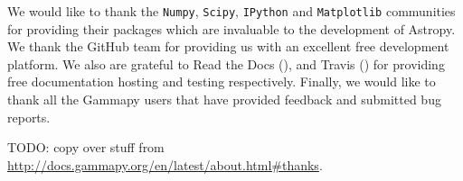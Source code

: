 \begin{acknowledgements}

We would like to thank the \texttt{Numpy}, \texttt{Scipy}, \texttt{IPython} and
\texttt{Matplotlib} communities for providing their packages which are invaluable
to the development of Astropy. We thank the GitHub team for providing us with
an excellent free development platform. We also are grateful to Read the Docs
(\ReadthedocsUrl), and Travis
(\TravisUrl) for providing free documentation
hosting and testing respectively. Finally, we would like to thank all the
Gammapy users that have provided feedback and submitted bug reports.    
    
TODO: copy over stuff from \url{http://docs.gammapy.org/en/latest/about.html#thanks}.

\end{acknowledgements}
